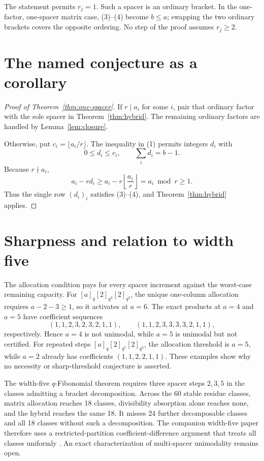 \documentclass[11pt]{article}
\begin{document}
The statement permits \(r_j=1\).  Such a spacer is an ordinary bracket.  In
the one-factor, one-spacer matrix case, (3)--(4) become \(b\leq a\); swapping
the two ordinary brackets covers the opposite ordering.  No step of the
proof assumes \(r_j\geq2\).

\section{The named conjecture as a corollary}

\begin{proof}[Proof of Theorem~\ref{thm:one-spacer}]
If \(r\mid a_i\) for some \(i\), pair that ordinary factor with the sole
spacer in Theorem~\ref{thm:hybrid}.  The remaining ordinary factors are
handled by Lemma~\ref{lem:closure}.

Otherwise, put \(c_i=\lfloor a_i/r\rfloor\).  The inequality in (1) permits
integers \(d_i\) with
\[
 0\leq d_i\leq c_i,
 \qquad \sum_i d_i=b-1.
\]
Because \(r\nmid a_i\),
\[
 a_i-rd_i\geq a_i-r\left\lfloor\frac{a_i}{r}\right\rfloor
 =a_i\bmod r\geq1.                                \tag{8}
\]
Thus the single row \((d_i)_i\) satisfies (3)--(4), and
Theorem~\ref{thm:hybrid} applies.
\end{proof}

\section{Sharpness and relation to width five}

The allocation condition pays for every spacer increment against the
worst-case remaining capacity.  For
\([a]_q[2]_{q^2}[2]_{q^3}\), the unique one-column allocation requires
\(a-2-3\geq1\), so it activates at \(a=6\).  The exact products at
\(a=4\) and \(a=5\) have coefficient sequences
\[
 (1,1,2,3,2,3,2,1,1),\qquad
 (1,1,2,3,3,3,3,2,1,1),
\]
respectively.  Hence \(a=4\) is not unimodal, while \(a=5\) is unimodal
but not certified.  For repeated steps
\([a]_q[2]_{q^2}[2]_{q^2}\), the allocation threshold is \(a=5\), while
\(a=2\) already has coefficients \((1,1,2,2,1,1)\).  These examples show
why no necessity or sharp-threshold conjecture is asserted.

The width-five \(q\)-Fibonomial theorem requires three spacer steps
\(2,3,5\) in the classes admitting a bracket decomposition.  Across the 60
stable residue classes, matrix allocation reaches 18 classes, divisibility
absorption alone reaches none, and the hybrid reaches the same 18.  It
misses 24 further decomposable classes and all 18 classes without such a
decomposition.  The companion width-five paper therefore uses a
restricted-partition coefficient-difference argument that treats all
classes uniformly \cite{ZhaoWidthFive}.  An exact characterization of
multi-spacer unimodality remains open.
\end{document}
